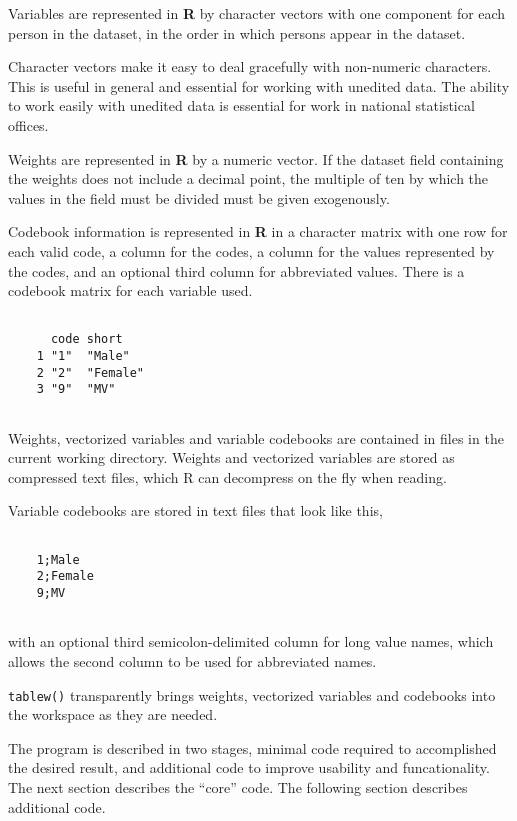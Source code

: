 Variables are represented in {\bf R} by character vectors with one component for each person in the dataset, in the order in which persons appear in the dataset.

Character vectors make it easy to deal gracefully with non-numeric characters. This is useful in general and essential for working with unedited data. The ability to work easily with unedited data is essential for work in national statistical offices.

Weights are represented in {\bf R} by a numeric vector. If the dataset field containing the weights does not include a decimal point, the multiple of ten by which the values in the field must be divided must be given exogenously.

Codebook information is represented in {\bf R} in a character matrix with one row for each valid code, a column for the codes, a column for the values represented by the codes, and an optional third column for abbreviated values. There is a codebook matrix for each variable used.

\begin{verbatim}

      code short   
    1 "1"  "Male"  
    2 "2"  "Female"
    3 "9"  "MV" 
	
\end{verbatim}

Weights, vectorized variables and variable codebooks are contained in files in the current working directory. Weights and vectorized variables are stored as compressed text files, which R can decompress on the fly when reading.

Variable codebooks are stored in text files that look like this, 

 \begin{verbatim}
 
    1;Male
    2;Female
    9;MV
	
\end{verbatim}

with an optional third semicolon-delimited column for long value names, which allows the second column to be used for abbreviated names.

{\tt tablew()} transparently brings weights, vectorized variables and codebooks into the workspace as they are needed.

The program is described in two stages, minimal code required to accomplished the desired result, and additional code to improve usability and funcationality. The next section describes the ``core'' code. The following section describes additional code.



